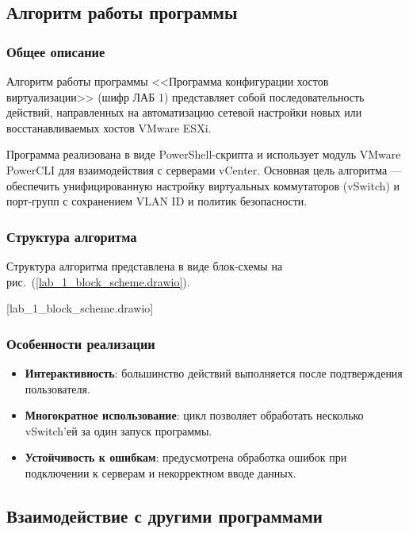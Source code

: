 \subsection{Алгоритм работы программы}

\subsubsection{Общее описание}
Алгоритм работы программы <<Программа конфигурации хостов виртуализации>> (шифр ЛАБ 1) представляет собой последовательность действий, направленных на автоматизацию сетевой настройки новых или восстанавливаемых хостов VMware ESXi.

Программа реализована в виде PowerShell-скрипта и использует модуль VMware PowerCLI для взаимодействия с серверами vCenter. Основная цель алгоритма --- обеспечить унифицированную настройку виртуальных коммутаторов (vSwitch) и порт-групп с сохранением VLAN ID и политик безопасности.

\subsubsection{Структура алгоритма}

Структура алгоритма представлена в виде блок-схемы на рис.~(\ref{lab_1_block_scheme.drawio}).

[lab_1_block_scheme.drawio]

\subsubsection{Особенности реализации}
\begin{itemize}
    \item \textbf{Интерактивность}: большинство действий выполняется после подтверждения пользователя.
    \item \textbf{Многократное использование}: цикл позволяет обработать несколько vSwitch'ей за один запуск программы.
    \item \textbf{Устойчивость к ошибкам}: предусмотрена обработка ошибок при подключении к серверам и некорректном вводе данных.
\end{itemize}

\subsection{Взаимодействие с другими программами}

